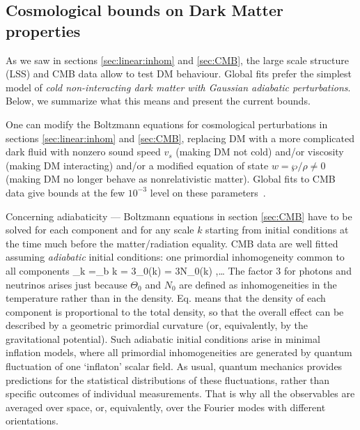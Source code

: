 \subsection{Cosmological bounds on Dark Matter properties}
As we saw in sections \ref{sec:linear:inhom} and \ref{sec:CMB}, the large scale structure (LSS) and CMB data allow to test DM behaviour.
Global fits prefer the simplest model of
{\em cold non-interacting dark matter with Gaussian adiabatic perturbations}.
Below, we summarize what this means and present the current bounds.

\medskip

One can modify the Boltzmann equations for cosmological perturbations in sections \ref{sec:linear:inhom} and \ref{sec:CMB}, 
replacing DM with 
a more complicated dark fluid with nonzero
sound speed $v_{s}$ (making DM not cold)
and/or viscosity (making DM interacting)
and/or a modified equation of state $w=\wp/\rho \neq 0$ (making DM no longer behave as nonrelativistic matter).
Global fits to CMB data give bounds at the few $10^{-3}$ level on these parameters~\cite{DMsoundspeed}.

\medskip

Concerning adiabaticity ---
Boltzmann equations in section \ref{sec:CMB} have to be solved for each component and for any scale $k$
starting from initial conditions at the time much before the matter/radiation equality.
CMB data are well fitted assuming {\em adiabatic} initial conditions:
one  primordial inhomogeneity common to all components
\beq\label{eq:adiabatic}
 \delta_k =\delta_{{\rm b} k} = 3\Theta_0(k) = 3N_0(k) ,\ldots \eeq 
The factor $3$ for photons and neutrinos arises just because
$\Theta_0$ and $N_0$ are defined as inhomogeneities in the temperature rather than in the density.
Eq. means that the density of each component is proportional to the total density,
so that the overall effect can be described by a geometric primordial curvature
(or, equivalently, by the gravitational potential).
Such adiabatic initial conditions arise in minimal inflation models, where all primordial inhomogeneities 
are generated by quantum fluctuation of one `inflaton' scalar field.
As usual, quantum mechanics provides predictions for the statistical distributions of these fluctuations, rather than specific outcomes of individual measurements.
That is why all the observables are  averaged over space, or, equivalently, over the Fourier modes with different orientations.

\smallskip


